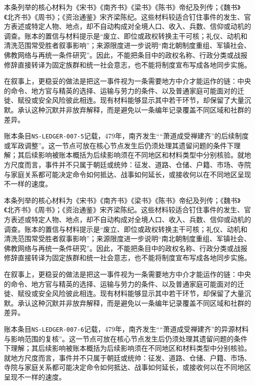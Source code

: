 本条列举的核心材料为《宋书》《南齐书》《梁书》《陈书》帝纪及列传；《魏书》《北齐书》《周书》；《资治通鉴》宋齐梁陈纪。这些材料较适合钉住事件的发生、官方表述或特定人物、地点，却不自动构成对全境人口、收入、兵数、信仰或动机的调查。账本的置信与材料提示是“废立、即位或政权转换主干可核；礼仪、动机和清洗范围常受胜者叙事影响”；来源限度进一步说明“南北朝制度重组、军镇社会、佛教网络与再统一条件研究”。因此，不能把条目中的政权名称、行政分类或战报修辞直接转译为固定族群和统一社会意志，也不能将制度宣布写成各地同步实施。

在叙事上，更稳妥的做法是把这一事件视为一条需要地方中介才能运作的链：中央的命令、地方官与精英的选择、运输与劳力的条件、以及普通家庭可能面对的迁徙、赋役或安全风险彼此相连。现有材料能够显示其中若干环节，却保留了大量沉默。承认这种沉默并非放弃解释，而是避免以一条编年记录覆盖不同区域和社群的差异。

账本条目\texttt{NS-LEDGER-007-5}记载，479年，南齐发生““萧道成受禅建齐”的后续制度或军政调整”。这一节点可放在核心节点发生后仍须处理其遗留问题的条件下理解；其后续影响被账本概括为后续影响须在不同地区和材料类型中分别核验。就地方尺度而言，事件并不只属于朝廷或统帅：征发、道路、仓储、户籍、市场、寺院与家庭关系都可能决定命令如何抵达、战事如何延长，或接收何以在不同地区呈现不一样的速度。

本条列举的核心材料为《宋书》《南齐书》《梁书》《陈书》帝纪及列传；《魏书》《北齐书》《周书》；《资治通鉴》宋齐梁陈纪。这些材料较适合钉住事件的发生、官方表述或特定人物、地点，却不自动构成对全境人口、收入、兵数、信仰或动机的调查。账本的置信与材料提示是“废立、即位或政权转换主干可核；礼仪、动机和清洗范围常受胜者叙事影响”；来源限度进一步说明“南北朝制度重组、军镇社会、佛教网络与再统一条件研究”。因此，不能把条目中的政权名称、行政分类或战报修辞直接转译为固定族群和统一社会意志，也不能将制度宣布写成各地同步实施。

在叙事上，更稳妥的做法是把这一事件视为一条需要地方中介才能运作的链：中央的命令、地方官与精英的选择、运输与劳力的条件、以及普通家庭可能面对的迁徙、赋役或安全风险彼此相连。现有材料能够显示其中若干环节，却保留了大量沉默。承认这种沉默并非放弃解释，而是避免以一条编年记录覆盖不同区域和社群的差异。

账本条目\texttt{NS-LEDGER-007-6}记载，479年，南齐发生““萧道成受禅建齐”的异源材料与影响范围的复核”。这一节点可放在核心节点发生后仍须处理其遗留问题的条件下理解；其后续影响被账本概括为后续影响须在不同地区和材料类型中分别核验。就地方尺度而言，事件并不只属于朝廷或统帅：征发、道路、仓储、户籍、市场、寺院与家庭关系都可能决定命令如何抵达、战事如何延长，或接收何以在不同地区呈现不一样的速度。

